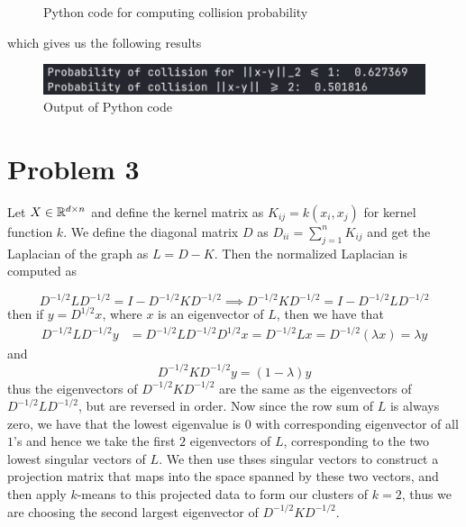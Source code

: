 \documentclass[12pt]{report}
\begin{document}
\begin{figure}[H]
  \centering
  
  \caption{Python code for computing collision probability}
\end{figure}

which gives us the following results

\begin{figure}[H]
  \centering
  \includegraphics[scale=0.7]{ouput.png}
  \caption{Output of Python code}
\end{figure}

\section*{Problem 3}
Let $X \in \mathbb{R}^{d \times n}$ and define the kernel matrix as $K_{ij} = k(x_i,x_j)$ for kernel function $k$. We define the diagonal matrix $D$ as $D_{ii} = \sum_{j=1}^n K_{ij}$ and get the Laplacian of the graph as $L = D - K$. Then the normalized Laplacian is computed as 

\begin{equation*}
  D^{-1/2}LD^{-1/2} = I - D^{-1/2}KD^{-1/2} \implies D^{-1/2}KD^{-1/2} = I - D^{-1/2}LD^{-1/2}
\end{equation*}
then if $y = D^{1/2}x$, where $x$ is an eigenvector of $L$, then we have that
\begin{align*}
  D^{-1/2}LD^{-1/2}y &= D^{-1/2}LD^{-1/2}D^{1/2}x = D^{-1/2}Lx = D^{-1/2}(\lambda x) = \lambda y
\end{align*}
and
\begin{equation*}
  D^{-1/2}KD^{-1/2}y = (1-\lambda)y
\end{equation*}
thus the eigenvectors of $D^{-1/2}KD^{-1/2}$ are the same as the eigenvectors of $D^{-1/2}LD^{-1/2}$, but are reversed in order. Now since the row sum of $L$ is always zero, we have that the lowest eigenvalue is $0$ with corresponding eigenvector of all $1$'s and hence we take the first $2$ eigenvectors of $L$, corresponding to the two lowest singular vectors of $L$. We then use thses singular vectors to construct a projection matrix that maps into the space spanned by these two vectors, and then apply $k$-means to this projected data to form our clusters of $k=2$, thus we are choosing the second largest eigenvector of $D^{-1/2}KD^{-1/2}$.
\end{document}
